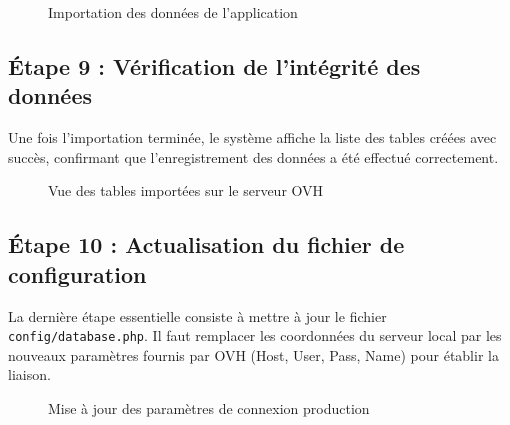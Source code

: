 \begin{figure}[H]
    \centering
    \caption{Importation des données de l'application}
\end{figure}

\subsection{Étape 9 : Vérification de l'intégrité des données}
Une fois l'importation terminée, le système affiche la liste des tables créées avec succès, confirmant que l'enregistrement des données a été effectué correctement.

\begin{figure}[H]
    \centering
    \caption{Vue des tables importées sur le serveur OVH}
\end{figure}

\subsection{Étape 10 : Actualisation du fichier de configuration}
La dernière étape essentielle consiste à mettre à jour le fichier \texttt{config/database.php}. Il faut remplacer les coordonnées du serveur local par les nouveaux paramètres fournis par OVH (Host, User, Pass, Name) pour établir la liaison.

\begin{figure}[H]
    \centering
    \caption{Mise à jour des paramètres de connexion production}
\end{figure}
